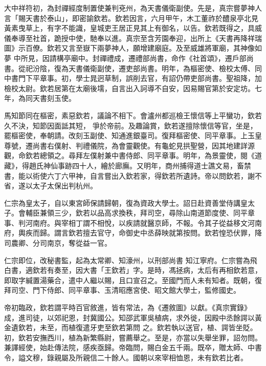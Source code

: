 \begin{pinyinscope}
 大中祥符初，為封禪經度制置使兼判兗州，為天書儀衛副使。先是，真宗嘗夢神人言「賜天書於泰山」，即密諭欽若。欽若因言，六月甲午，木工董祚於醴泉亭北見黃素曳草上，有字不能識，皇城吏王居正見其上有御名，以告。欽若既得之，具威儀奉導至社首，跪授中使，馳奉以進。真宗至含芳園奉迎，出所上《天書再降祥瑞圖》示百僚。欽若又言至嶽下兩夢神人，願增建廟庭。及至威雄將軍廟，其神像如夢
 中所見，因請構亭廟中。封禪禮成，遷禮部尚書，命作《社首頌》，遷戶部尚書。從祀汾陰，復為天書儀衛副使，遷吏部尚書。明年，為樞密使、檢校太傅、同中書門下平章事。初，學士晁迥草制，誤削去官，有詔仍帶吏部尚書。聖祖降，加檢校太尉。欽若居第在太廟後壖，自言出入訶導不自安，因易賜官第於安定坊。七年，為同天書刻玉使。



 馬知節同在樞密，素惡欽若，議論不相下。會瀘州都巡檢王懷信等上平蠻功，欽若久不決，知節因面詆其短，
 爭於帝前。及趣論賞，欽若遂擅除懷信等官，坐是，罷樞密使，奉朝請。改刻玉副使、知通進銀臺司。復拜樞密使、同平章事。上玉皇尊號，遷尚書右僕射、判禮儀院，為會靈觀使。有龜蛇見拱聖營，因其地建詳源觀，命欽若總領之。尋拜左僕射兼中書侍郎、同平章事。明年，為景靈使，閱《道藏》，得趙氏神仙事跡四十人，繪於廊廡。又明年，商州捕得道士譙文易，畜禁書，能以術使六丁六甲神，自言嘗出入欽若家，得欽若所遺詩。帝以問欽若，謝不
 省，遂以太子太保出判杭州。



 仁宗為皇太子，自以東宮師保請歸朝，復為資政大學士。詔日赴資善堂侍講皇太子。會輔臣兼領三少，欽若以品高求換秩，拜司空，尋除山南道節度使、同平章事、判河南府。與宰相丁謂不相悅，以疾請就醫京師，不報。令其子從益移文河南府，輿疾而歸。謂言欽若擅去官守，命御史中丞薛映就第按問。欽若惶恐伏罪，降司農卿、分司南京，奪從益一官。



 仁宗即位，改秘書監，起為太常卿、知濠州，以刑部尚書
 知江寧府。仁宗嘗為飛白書，適欽若有奏至，因大書「王欽若」字。是時，馮拯病，太后有再相欽若意，即取字緘置湯藥合，遣中人繼以賜，且口宣召之。至國門而人未有知者。既朝，復拜司空、門下侍郎、同平章事、玉清昭應宮使、昭文館大學士，監修國史。



 帝初臨政，欽若謂平時百官敘進，皆有常法，為《遷敘圖》以獻。《真宗實錄》成，進司徒，以郊祀恩，封冀國公。知邵武軍吳植病，求外徙，因殿中丞餘諤以黃金遺欽若，未至，而植復遣牙吏至欽若第問
 之。欽若執以送官，植、諤皆坐貶。初，欽若安撫西川，植為新繁縣尉，嘗薦舉之。至是，亦當以失舉坐罪，詔勿問。兼譯經使，始赴傳法院，感疾亟歸。帝臨問，賜白金五千兩。既卒，贈太師、中書令，謚文穆，錄親屬及所親信二十餘人。國朝以來宰相恤恩，未有欽若比者。




\end{pinyinscope}
